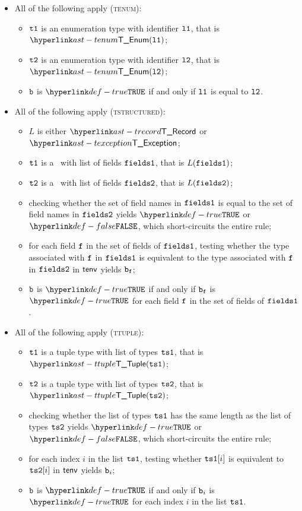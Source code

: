 \begin{itemize}
  \item All of the following apply (\textsc{tenum}):
  \begin{itemize}
    \item $\texttt{t1}$ is an enumeration type with identifier $\texttt{l1}$, that is $\TEnum(\vlone)$;
    \item $\texttt{t2}$ is an enumeration type with identifier $\texttt{l2}$, that is $\TEnum(\vltwo)$;
    \item $\texttt{b}$ is $\True$ if and only if $\texttt{l1}$ is equal to $\texttt{l2}$.
  \end{itemize}

  \item All of the following apply (\textsc{tstructured}):
  \begin{itemize}
    \item $L$ is either $\TRecord$ or $\TException$;
    \item $\texttt{t1}$ is a \structuredtype\ with list of fields $\texttt{fields1}$, that is $L(\texttt{fields1})$;
    \item $\texttt{t2}$ is a \structuredtype\ with list of fields $\texttt{fields2}$, that is $L(\texttt{fields2})$;
    \item checking whether the set of field names in $\texttt{fields1}$ is equal to the set of field names in $\texttt{fields2}$
          yields $\True$ or $\False$, which short-circuits the entire rule;
    \item for each field $\texttt{f}$ in the set of fields of $\texttt{fields1}$, testing whether the type associated with
          $\texttt{f}$ in $\texttt{fields1}$ is equivalent to the type associated with
          $\texttt{f}$ in $\texttt{fields2}$ in $\textsf{tenv}$ yields $\texttt{b}_{\texttt{f}}$\ProseOrTypeError;
    \item $\texttt{b}$ is $\True$ if and only if $\texttt{b}_{\texttt{f}}$ is $\True$ for each field $\texttt{f}$ in the set of fields of $\texttt{fields1}$.
  \end{itemize}

  \item All of the following apply (\textsc{ttuple}):
  \begin{itemize}
    \item $\texttt{t1}$ is a tuple type with list of types $\texttt{ts1}$, that is $\TTuple(\vtsone)$;
    \item $\texttt{t2}$ is a tuple type with list of types $\texttt{ts2}$, that is $\TTuple(\vtstwo)$;
    \item checking whether the list of types $\texttt{ts1}$ has the same length as the list of types $\texttt{ts2}$ yields $\True$
          or $\False$, which short-circuits the entire rule;
    \item for each index $i$ in the list $\texttt{ts1}$, testing whether $\texttt{ts1}[i]$ is equivalent to $\texttt{ts2}[i]$ in $\textsf{tenv}$
          yields $\texttt{b}_i$\ProseOrTypeError;
    \item $\texttt{b}$ is $\True$ if and only if $\texttt{b}_i$ is $\True$ for each index $i$ in the list $\texttt{ts1}$.
  \end{itemize}
\end{itemize}

